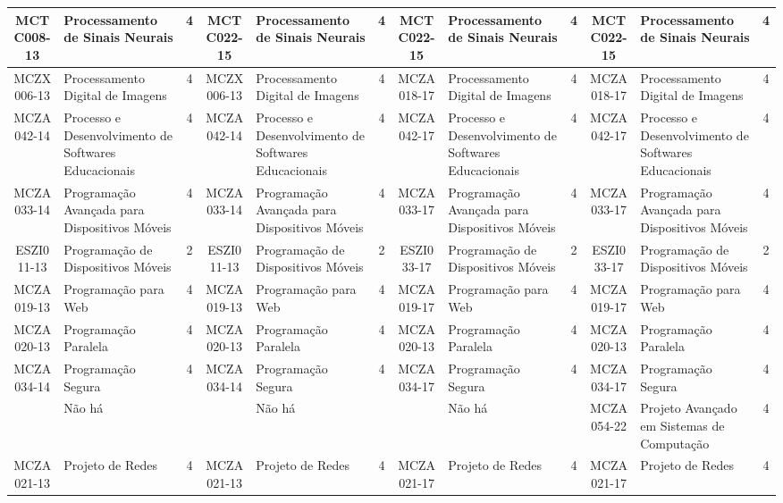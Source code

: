 \documentclass[a4paper]{article}
\begin{document}
\begin{landscape}
{\begin{longtable}{|c|p{.2\textheight}|c||c|p{.2\textheight}|c||c|p{.2\textheight}|c||c|p{.2\textheight}|c|}
MCTC008-13 & Processamento de Sinais Neurais & 4 &
MCTC022-15 & Processamento de Sinais Neurais & 4 &
MCTC022-15 & Processamento de Sinais Neurais & 4 &
MCTC022-15 & Processamento de Sinais Neurais & 4\\ \hline

MCZX006-13 & Processamento Digital de Imagens & 4 &
MCZX006-13 & Processamento Digital de Imagens & 4 &
MCZA018-17 & Processamento Digital de Imagens & 4 &
MCZA018-17 & Processamento Digital de Imagens & 4\\ \hline

MCZA042-14 & Processo e Desenvolvimento de Softwares Educacionais & 4 &
MCZA042-14 & Processo e Desenvolvimento de Softwares Educacionais & 4 &
MCZA042-17 & Processo e Desenvolvimento de Softwares Educacionais & 4 & 
MCZA042-17 & Processo e Desenvolvimento de Softwares Educacionais & 4\\ \hline

MCZA033-14 & Programação Avançada para Dispositivos Móveis & 4 &
MCZA033-14 & Programação Avançada para Dispositivos Móveis & 4 &
MCZA033-17 & Programação Avançada para Dispositivos Móveis & 4 & 
MCZA033-17 & Programação Avançada para Dispositivos Móveis & 4\\ \hline

ESZI011-13 & Programação de Dispositivos Móveis & 2 &
ESZI011-13 & Programação de Dispositivos Móveis & 2 &
ESZI033-17 & Programação de Dispositivos Móveis & 2 &
ESZI033-17 & Programação de Dispositivos Móveis & 2\\ \hline

MCZA019-13 & Programação para Web & 4 &
MCZA019-13 & Programação para Web & 4 &
MCZA019-17 & Programação para Web & 4 &
MCZA019-17 & Programação para Web & 4\\ \hline

MCZA020-13 & Programação Paralela & 4 &
MCZA020-13 & Programação Paralela & 4 &
MCZA020-13 & Programação Paralela & 4 & 
MCZA020-13 & Programação Paralela & 4\\ \hline

MCZA034-14 & Programação Segura & 4 &
MCZA034-14 & Programação Segura & 4 &
MCZA034-17 & Programação Segura & 4 &
MCZA034-17 & Programação Segura & 4\\ \hline

& Não há & &
& Não há & & 
& Não há & & 
MCZA054-22 & Projeto Avançado em Sistemas de Computação & 4\\ \hline

MCZA021-13 & Projeto de Redes & 4 &
MCZA021-13 & Projeto de Redes & 4 &
MCZA021-17 & Projeto de Redes & 4 &
MCZA021-17 & Projeto de Redes & 4\\ \hline


\end{longtable}}
\end{landscape}
\end{document}
